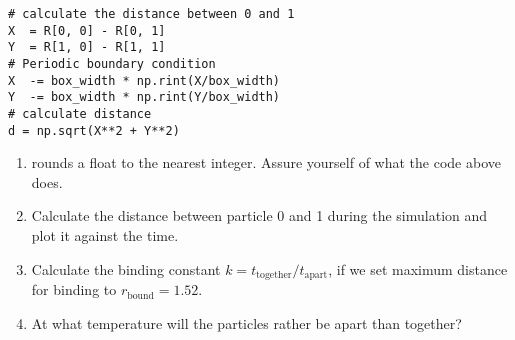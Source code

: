 \documentclass{article}
\begin{document}
\begin{lstlisting}
# calculate the distance between 0 and 1
X  = R[0, 0] - R[0, 1]
Y  = R[1, 0] - R[1, 1]
# Periodic boundary condition
X  -= box_width * np.rint(X/box_width)
Y  -= box_width * np.rint(Y/box_width)
# calculate distance
d = np.sqrt(X**2 + Y**2)
\end{lstlisting}

\begin{enumerate}[resume]
    \item {} rounds a float to the nearest integer. Assure yourself of what the code above does.

    \item Calculate the distance between particle 0 and 1 during the simulation and plot it against the  time.

    \item Calculate the binding constant $k = t_\mathrm{together} / t_\mathrm{apart}$,
        if we set maximum distance for binding to $r_\mathrm{bound} = 1.52$.

    \item At what temperature will the particles rather be apart than together?

\end{enumerate}


\end{document}
